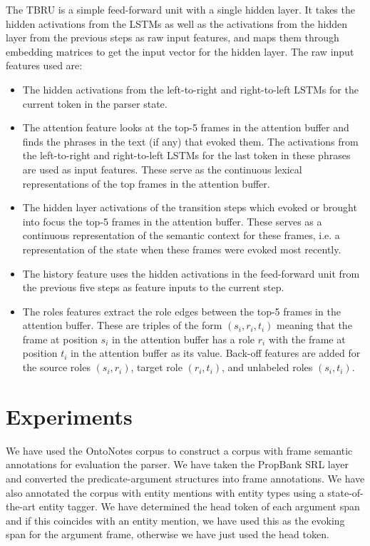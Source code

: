 \documentclass[11pt,a4paper]{article}
\begin{document}
The TBRU is a simple feed-forward unit with a single hidden layer.
It takes the hidden activations from the LSTMs as well as the activations from
the hidden layer from the previous steps as raw input features, and maps them
through embedding matrices to get the input vector for the  hidden layer. The
raw input features used are:

\begin{itemize}
  \item The hidden activations from the left-to-right and right-to-left LSTMs
  for the current token in the parser state.
  \item The attention feature looks at the top-5 frames in the attention buffer
  and finds the phrases in the text (if any) that evoked them. The activations
  from the left-to-right and right-to-left LSTMs for the last token in these
  phrases are used as input features. These serve as the continuous lexical
  representations of the top frames in the attention buffer.
  \item The hidden layer activations of the transition steps which evoked or
  brought into focus the top-5 frames in the attention buffer. These serves as a
  continuous representation of the semantic context for these frames, i.e. a
  representation of the state when these frames were evoked most recently.
  \item The history feature uses the hidden activations in the feed-forward
  unit from the previous five steps as feature inputs to the current step.
  \item The roles features extract the role edges between the top-5 frames in
  the attention buffer. These are triples of the form $(s_i, r_i, t_i)$ meaning
  that the frame at position $s_i$ in the attention buffer has a role $r_i$ with
  the frame at position $t_i$ in the attention buffer as its value. Back-off
  features are added for the source roles $(s_i,r_i)$, target role $(r_i, t_i)$,
  and unlabeled roles $(s_i,t_i)$.
\end{itemize}

\section{Experiments}

We have used the OntoNotes corpus \cite{ontonotes2006} to construct a corpus
with frame semantic annotations for evaluation the parser. We have taken the
PropBank SRL layer \cite{palmer2005} and converted the predicate-argument
structures into frame annotations. We have also annotated the corpus with
entity mentions with entity types using a state-of-the-art entity tagger.
We have determined the head token of each argument span and if this coincides
with an entity mention, we have used this as the evoking span for the argument
frame, otherwise we have just used the head token.
\end{document}
